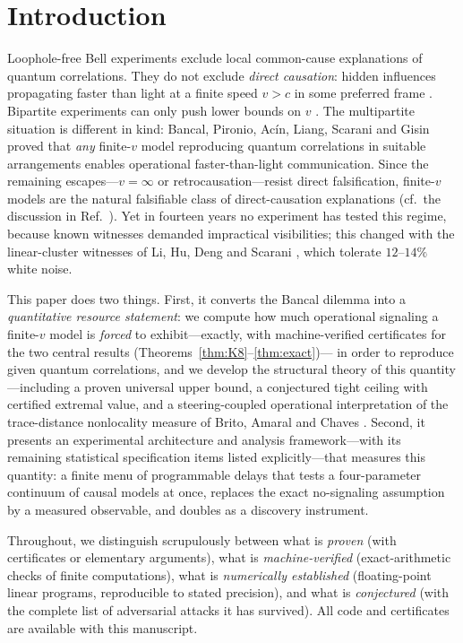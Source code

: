 \documentclass[10pt,twocolumn]{article}
\begin{document}
\section{Introduction}
\label{sec:intro}

Loophole-free Bell experiments \cite{Hensen2015,Giustina2015,Shalm2015} exclude local common-cause explanations of quantum correlations. They do not exclude \emph{direct causation}: hidden influences propagating faster than light at a finite speed $v>c$ in some preferred frame \cite{Eberhard1989,ScaraniGisin2002,ScaraniGisin2005}. Bipartite experiments can only push lower bounds on $v$ \cite{Salart2008,Cocciaro2011,Yin2013,Cocciaro2018}. The multipartite situation is different in kind: Bancal, Pironio, Ac\'in, Liang, Scarani and Gisin \cite{Bancal2012} proved that \emph{any} finite-$v$ model reproducing quantum correlations in suitable arrangements enables operational faster-than-light communication. Since the remaining escapes---$v=\infty$ or retrocausation---resist direct falsification, finite-$v$ models are the natural falsifiable class of direct-causation explanations (cf.\ the discussion in Ref.~\cite{Li2026}). Yet in fourteen years no experiment has tested this regime, because known witnesses demanded impractical visibilities; this changed with the linear-cluster witnesses of Li, Hu, Deng and Scarani \cite{Li2026}, which tolerate $12$--$14\%$ white noise.

This paper does two things. First, it converts the Bancal dilemma into a \emph{quantitative resource statement}: we compute how much operational signaling a finite-$v$ model is \emph{forced} to exhibit---exactly, with machine-verified certificates for the two central results (Theorems~\ref{thm:K8}--\ref{thm:exact})--- in order to reproduce given quantum correlations, and we develop the structural theory of this quantity---including a proven universal upper bound, a conjectured tight ceiling with certified extremal value, and a steering-coupled operational interpretation of the trace-distance nonlocality measure of Brito, Amaral and Chaves \cite{Brito2018}. Second, it presents an experimental architecture and analysis framework---with its remaining statistical specification items listed explicitly---that measures this quantity: a finite menu of programmable delays that tests a four-parameter continuum of causal models at once, replaces the exact no-signaling assumption by a measured observable, and doubles as a discovery instrument.

Throughout, we distinguish scrupulously between what is \emph{proven} (with certificates or elementary arguments), what is \emph{machine-verified} (exact-arithmetic checks of finite computations), what is \emph{numerically established} (floating-point linear programs, reproducible to stated precision), and what is \emph{conjectured} (with the complete list of adversarial attacks it has survived). All code and certificates are available with this manuscript.
\end{document}
